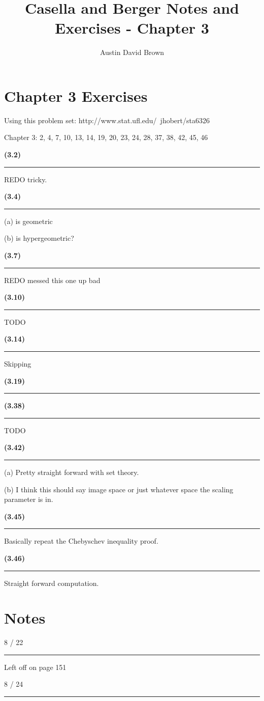 \documentclass[12pt, reqno]{amsart}
\numberwithin{equation}{section}
\begin{document}
\title{Casella and Berger Notes and Exercises -  Chapter 3}
\author{Austin David Brown}
\maketitle

\section*{Chapter 3 Exercises}

Using this problem set:
http://www.stat.ufl.edu/~jhobert/sta6326

Chapter 3: 2, 4, 7, 10, 13, 14, 19, 20, 23, 24, 28, 37, 38, 42, 45, 46

{\bf (3.2)\rule{\textwidth}{.5pt}}

REDO tricky.

{\bf (3.4)\rule{\textwidth}{.5pt}}

(a) is geometric

(b) is hypergeometric?

{\bf (3.7)\rule{\textwidth}{.5pt}}

 REDO messed this one up bad

{\bf (3.10)\rule{\textwidth}{.5pt}}

TODO

{\bf (3.14)\rule{\textwidth}{.5pt}}

Skipping

{\bf (3.19)\rule{\textwidth}{.5pt}}

{\bf (3.38)\rule{\textwidth}{.5pt}}

TODO

{\bf (3.42)\rule{\textwidth}{.5pt}}

(a) Pretty straight forward with set theory.

(b) I think this should say image space or just whatever space the scaling parameter is in.

{\bf (3.45)\rule{\textwidth}{.5pt}}

Basically repeat the Chebyschev inequality proof.

{\bf (3.46)\rule{\textwidth}{.5pt}}

Straight forward computation.

\section*{Notes}

8 / 22
\rule{\textwidth}{.5pt}

Left off on page 151

8 / 24
\rule{\textwidth}{.5pt}
\end{document}
